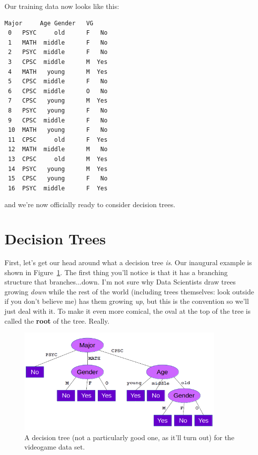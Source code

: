 
\smallskip
Our training data now looks like this:
\label{vgDataSet}

\begin{Verbatim}[fontsize=\small,samepage=true,frame=single,framesep=3mm,xleftmargin=2.3cm,xrightmargin=2.5cm]
    Major     Age Gender   VG
 0   PSYC     old      F   No
 1   MATH  middle      F   No
 2   PSYC  middle      F   No
 3   CPSC  middle      M  Yes
 4   MATH   young      M  Yes
 5   CPSC  middle      F   No
 6   CPSC  middle      O   No
 7   CPSC   young      M  Yes
 8   PSYC   young      F   No
 9   CPSC  middle      F   No
 10  MATH   young      F   No
 11  CPSC     old      F  Yes
 12  MATH  middle      M   No
 13  CPSC     old      M  Yes
 14  PSYC   young      M  Yes
 15  CPSC   young      F   No
 16  PSYC  middle      F  Yes
\end{Verbatim}

and we're now officially ready to consider decision trees.

\section{Decision Trees}


First, let's get our head around what a decision tree \textit{is}. Our
inaugural example is shown in Figure~\ref{fig:decisionTree}. The first thing
you'll notice is that it has a branching structure that branches...down. I'm
not sure why Data Scientists draw trees growing \textit{down} while the rest of
the world (including trees themselves: look outside if you don't believe me)
has them growing \textit{up}, but this is the convention so we'll just deal
with it. To make it even more comical, the oval at the top of the tree is
called the \textbf{root} of the tree. Really.

\begin{figure}[ht]
\centering
\includegraphics[width=0.9\textwidth]{decisionTree.png}
\caption{A decision tree (not a particularly good one, as it'll turn out) for
the videogame data set.}
\label{fig:decisionTree}
\end{figure}

